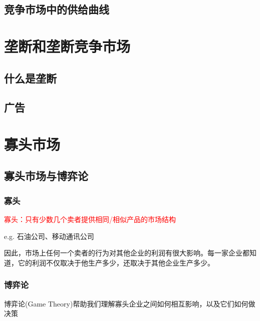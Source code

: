 \documentclass[12pt, a4paper]{article}
\begin{document}
\subsection{竞争市场中的供给曲线}


\newpage
\section{垄断和垄断竞争市场}

\subsection{什么是垄断}


\subsection{广告}

\newpage
\section{寡头市场}

\subsection{寡头市场与博弈论}

\subsubsection{寡头}

\textcolor{red}{寡头：只有少数几个卖者提供相同/相似产品的市场结构}

e.g. 石油公司、移动通讯公司

因此，市场上任何一个卖者的行为对其他企业的利润有很大影响。每一家企业都知道，它的利润不仅取决于他生产多少，还取决于其他企业生产多少。

\subsubsection{博弈论}

博弈论(Game Theory)帮助我们理解寡头企业之间如何相互影响，以及它们如何做决策
\end{document}
